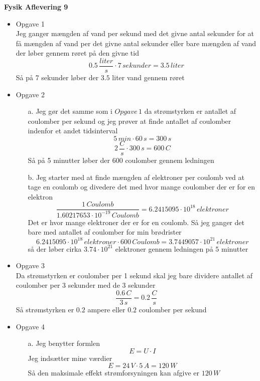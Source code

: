 \documentclass[12pt]{article}
\begin{document}
\Large{\textbf{Fysik Aflevering 9}}

\begin{itemize}
  \item {Opgave 1}\\
  Jeg ganger mængden af vand per sekund med det givne antal sekunder for at få mængden af vand per det givne antal sekunder eller bare mængden af vand der løber gennem røret på den givne tid\\
  $$
  0.5\, \frac{liter}{s} \cdot 7\, sekunder = 3.5\, liter
  $$
  Så på 7 sekunder løber der $3.5$ liter vand gennem røret\\

  \item {Opgave 2}
  \begin{enumerate}
    \item[a.] Jeg gør det samme som i $Opgave\, 1$ da strømstyrken er antallet af coulomber per sekund og jeg prøver at finde antallet af coulomber indenfor et andet tidsinterval\\
    $$
    5\, min \cdot 60\, s = 300\, s
    $$
    $$
    2\, \frac{C}{s} \cdot 300\, s = 600\, C
    $$
    Så på 5 minutter løber der $600$ coulomber gennem ledningen\\

    \item[b.] Jeg starter med at finde mængden af elektroner per coulomb ved at tage en coulomb og divedere det med hvor mange coulomber der er for en elektron\\
    $$
    \frac{1\, Coulomb}{1.60217653 \cdot 10^{-19}\, Coulomb} = 6.2415095 \cdot 10^{18}\, elektroner
    $$
    Det er hvor mange elektroner der er for en coulomb. Så jeg ganger det bare med antallet af coulomber for min brødrister\\
    $$
    6.2415095 \cdot 10^{18}\, elektroner \cdot 600\, Coulomb = 3.7449057 \cdot 10^{21}\, elektroner
    $$
    så der løber cirka $3.74 \cdot 10^{21}$ elektroner gennem ledningen på 5 minutter\\
  \end{enumerate}

  \item{Opgave 3}\\
  Da strømstyrken er coulomber per 1 sekund skal jeg bare dividere antallet af coulomber per 3 sekunder med de 3 sekunder
  $$
  \frac{0.6\, C}{3\, s} = 0.2\, \frac{C}{s}
  $$
  Så strømstyrken er $0.2$ ampere eller $0.2$ coulomber per sekund\\

  \item{Opgave 4}
  \begin{enumerate}
    \item[a.] Jeg benytter formlen
    $$
    E = U \cdot I
    $$
    Jeg indsætter mine værdier
    $$
    E = 24\, V \cdot 5\, A = 120\, W
    $$
    Så den maksimale effekt strømforsyningen kan afgive er $120\, W$\\


\end{enumerate}
\end{itemize}
\end{document}
